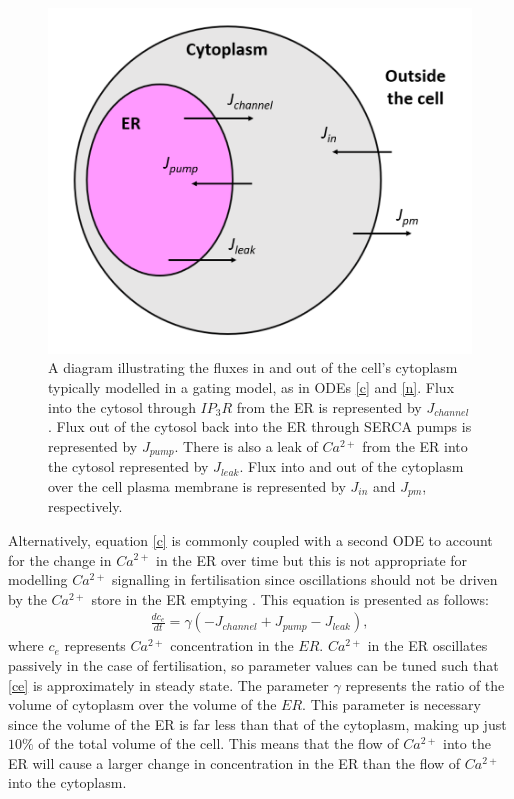 {\begin{figure}[h!!!t!!!b!!!p]
  \centering
  \includegraphics[width=1\linewidth]{Chapters/1_Introduction/extras/classicmodel.PNG}
  \caption{A diagram illustrating the fluxes in and out of the cell's cytoplasm typically modelled in a gating model, as in ODEs \eqref{c} and \eqref{n}. Flux into the cytosol through $IP_3R$ from the ER is represented by $J_{channel}$. Flux out of the cytosol back into the ER through SERCA pumps is represented by $J_{pump}$. There is also a leak of $Ca^{2+}$ from the ER into the cytosol represented by $J_{leak}$. Flux into and out of the cytoplasm over the cell plasma membrane is represented by $J_{in}$ and {$J_{pm}$}, respectively.}\label{classicmodel}
\end{figure}

Alternatively, equation \eqref{c} is commonly coupled with a second ODE to account for the change in $Ca^{2+}$ in the ER over time but this is not appropriate for modelling $Ca^{2+}$ signalling in fertilisation since oscillations should not be driven by the $Ca^{2+}$ store in the ER emptying . This equation is presented as follows:
\begin{align}
    \frac{dc_e}{dt}=\gamma(-J_{channel}+J_{pump}-J_{leak}),\label{ce}
\end{align}
where $c_e$ represents $Ca^{2+}$ concentration in the $ER$. {$Ca^{2+}$ in the ER oscillates passively in the case of fertilisation, so parameter values can be tuned such that \eqref{ce} is approximately in steady state.} The parameter $\gamma$ represents the ratio of the volume of cytoplasm over the volume of the $ER$. This parameter is necessary since the volume of the ER is far less than that of the cytoplasm, making up just $10\%$ of the total volume of the cell. This means that the flow of $Ca^{2+}$ into the ER will cause a larger change in concentration in the ER than the flow of $Ca^{2+}$ into the cytoplasm.

}
